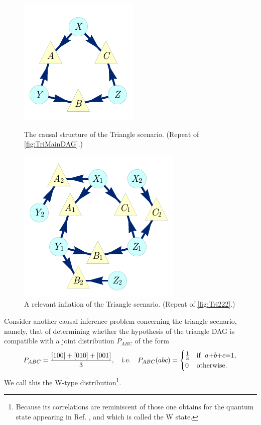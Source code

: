 \par\smallskip\nobreak
\begin{figure}[bh]
\centering
\begin{minipage}[t]{0.45\linewidth}
\centering
\includegraphics[scale=1]{TriDagRaw.pdf}
\caption{The causal structure of the Triangle scenario. (Repeat of \cref{fig:TriMainDAG}.)}\label{fig:TriMainDAGv3}
\end{minipage}
\hfill
\begin{minipage}[t]{0.45\linewidth}
\centering
\includegraphics[scale=1]{TriDagSub222.pdf}
\caption{A relevant inflation of the Triangle scenario. (Repeat of \cref{fig:Tri222}.)}\label{fig:Tri222v2}
\end{minipage}
\end{figure}


Consider another causal inference problem concerning the triangle scenario, namely, that of determining whether the hypothesis of the triangle DAG is compatible with a joint distribution 
$P_{A B C}$ of the form
\begin{align}\label{eq:wdistribution1}
P_{A B C}=\frac{[100]+[010]+[001]}{3},\quad\text{i.e.}\quad P_{A B C}(a b c)=\begin{cases}\tfrac{1}{3}&\text{if }\; a\mathord{+}b\mathord{+}c\mathord{=} 1, \\ 0&\text{otherwise}.\end{cases}
\end{align}
We call this the W-type distribution\footnote{Because its correlations are reminiscent of those one obtains for the quantum state appearing in Ref. \cite{3Qubits2Ways}, and which is called the W state.}. 

